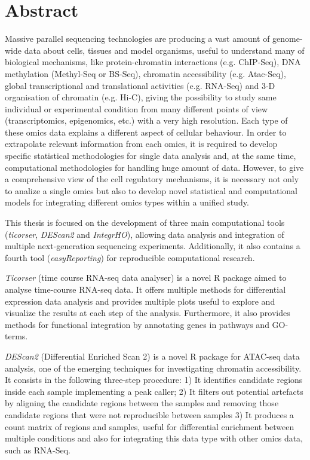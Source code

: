 \section*{Abstract}
{\setlength{\parindent}{0cm}
Massive parallel sequencing technologies are producing a vast amount of genome-wide data about cells, tissues and model organisms, useful to understand many of biological mechanisms, like protein-chromatin interactions (e.g. ChIP-Seq), DNA methylation (Methyl-Seq or BS-Seq), chromatin accessibility (e.g. Atac-Seq), global transcriptional and translational activities (e.g. RNA-Seq) and 3-D organisation of chromatin (e.g. Hi-C), giving the possibility to study same individual or experimental condition from many different points of view (transcriptomics, epigenomics, etc.) with a very high resolution. Each type of these omics data explains a different aspect of cellular behaviour.
In order to extrapolate relevant information from each omics, it is required to develop specific statistical methodologies for single data analysis and, at the same time, computational methodologies for handling huge amount of data.
However, to give a comprehensive view of the cell regulatory mechanisms, it is necessary not only to analize a single omics but also to develop novel statistical and computational models for integrating different omics types within a unified study.

This thesis is focused on the development of three main computational tools (\textit{ticorser}, \textit{DEScan2} and \textit{IntegrHO}), allowing data analysis and integration of multiple next-generation sequencing experiments.
Additionally, it also contains a fourth tool (\textit{easyReporting}) for reproducible computational research.

\textit{Ticorser} (time course RNA-seq data analyser) is a novel R package aimed to analyse time-course RNA-seq data. It offers multiple methods for differential expression data analysis and provides multiple plots useful to explore and visualize the results at each step of the analysis. Furthermore, it also provides methods for functional integration by annotating genes in pathways and GO-terms.

\textit{DEScan2} (Differential Enriched Scan 2) is a novel R package for ATAC-seq data analysis, one of the emerging techniques for investigating chromatin accessibility. It consists in the following three-step procedure: 1) It identifies candidate regions inside each sample implementing a peak caller; 2) It filters out potential artefacts by aligning the candidate regions between the samples and removing those candidate regions that were not reproducible between samples 3) It produces a count matrix of regions and samples, useful for differential enrichment between multiple conditions and also for integrating this data type with other omics data, such as RNA-Seq.

}
